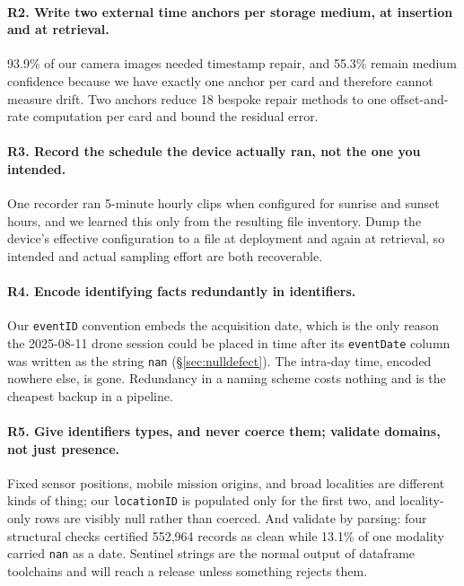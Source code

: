 \documentclass[sigconf]{acmart}
\begin{document}
\paragraph{R2. Write two external time anchors per storage medium, at
insertion and at retrieval.}
93.9\% of our camera images needed timestamp repair, and 55.3\% remain
medium confidence because we have exactly one anchor per card and
therefore cannot measure drift. Two anchors reduce 18 bespoke repair
methods to one offset-and-rate computation per card and bound the
residual error.

\paragraph{R3. Record the schedule the device actually ran, not the one
you intended.}
One recorder ran 5-minute hourly clips when configured for sunrise and
sunset hours, and we learned this only from the resulting file
inventory. Dump the device's effective configuration to a file at
deployment and again at retrieval, so intended and actual sampling
effort are both recoverable.

\paragraph{R4. Encode identifying facts redundantly in identifiers.}
Our \texttt{eventID} convention embeds the acquisition date, which is
the only reason the 2025-08-11 drone session could be placed in time
after its \texttt{eventDate} column was written as the string
\texttt{nan} (\S\ref{sec:nulldefect}). The intra-day time, encoded
nowhere else, is gone. Redundancy in a naming scheme costs nothing and
is the cheapest backup in a pipeline.

\paragraph{R5. Give identifiers types, and never coerce them; validate
domains, not just presence.}
Fixed sensor positions, mobile mission origins, and broad localities are
different kinds of thing; our \texttt{locationID} is populated only for
the first two, and locality-only rows are visibly null rather than
coerced. And validate by parsing: four structural checks certified
552{,}964 records as clean while 13.1\% of one modality carried
\texttt{nan} as a date. Sentinel strings are the normal output of
dataframe toolchains and will reach a release unless something rejects
them.
\end{document}
